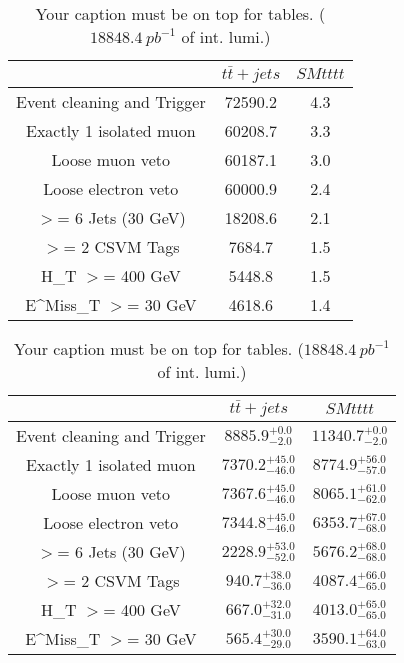 \documentclass{article}
\begin{document}
\begin{table}
\caption{Your caption must be on top for tables. ($18848.4~pb^{-1}$ of int. lumi.)}
\label{tab:}
\centering
\begin{tabular}{|c|cc|}
\toprule
&$t\bar{t}+jets$	&$SM tttt$	\\

\midrule
Event cleaning and Trigger&	72590.2	&4.3	\\

Exactly 1 isolated muon&	60208.7	&3.3	\\

Loose muon veto&	60187.1	&3.0	\\

Loose electron veto&	60000.9	&2.4	\\

$>$= 6 Jets (30 GeV)&	18208.6	&2.1	\\

$>$= 2 CSVM Tags&	7684.7	&1.5	\\

H_{T} $>$=  400 GeV&	5448.8	&1.5	\\

E^{Miss}_{T} $>$=  30 GeV&	4618.6	&1.4	\\

\bottomrule
\end{tabular}
\end{table}
\begin{table}
\caption{Your caption must be on top for tables. ($18848.4~pb^{-1}$ of int. lumi.)}
\label{tab:}
\centering
\begin{tabular}{|c|cc|}
\toprule
&$t\bar{t}+jets$	&$SM tttt$	\\

\midrule
Event cleaning and Trigger&	$8885.9^{+0.0}_{-2.0}$	&$11340.7^{+0.0}_{-2.0}$	\\

Exactly 1 isolated muon&	$7370.2^{+45.0}_{-46.0}$	&$8774.9^{+56.0}_{-57.0}$	\\

Loose muon veto&	$7367.6^{+45.0}_{-46.0}$	&$8065.1^{+61.0}_{-62.0}$	\\

Loose electron veto&	$7344.8^{+45.0}_{-46.0}$	&$6353.7^{+67.0}_{-68.0}$	\\

$>$= 6 Jets (30 GeV)&	$2228.9^{+53.0}_{-52.0}$	&$5676.2^{+68.0}_{-68.0}$	\\

$>$= 2 CSVM Tags&	$940.7^{+38.0}_{-36.0}$	&$4087.4^{+66.0}_{-65.0}$	\\

H_{T} $>$=  400 GeV&	$667.0^{+32.0}_{-31.0}$	&$4013.0^{+65.0}_{-65.0}$	\\

E^{Miss}_{T} $>$=  30 GeV&	$565.4^{+30.0}_{-29.0}$	&$3590.1^{+64.0}_{-63.0}$	\\

\bottomrule
\end{tabular}
\end{table}
\end{document}
